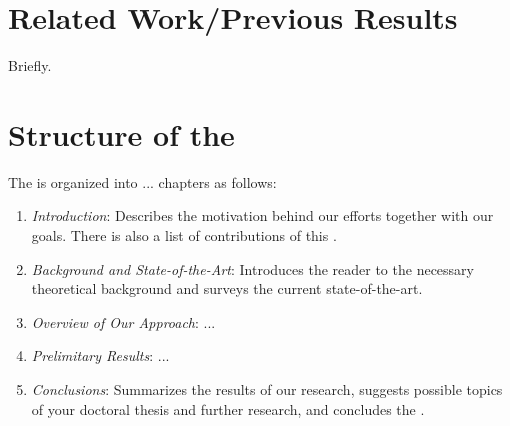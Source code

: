 \section{Related Work/Previous Results}
Briefly.

\section{Structure of the \Thesis{}}
The \thesis{} is organized into ... chapters as follows:
\begin{enumerate}
\item \emph{Introduction}: Describes the motivation behind our efforts together with our goals. There is also a list of contributions of this \thesis. 

\item \emph{Background and State-of-the-Art}: Introduces the reader to the necessary theoretical background and surveys the current state-of-the-art.

\item \emph{Overview of Our Approach}: ...

\item \emph{Prelimitary Results}: ...

\item \emph{Conclusions}: Summarizes the results of our research, suggests possible topics of your doctoral thesis and further research, and concludes the \thesis.
\end{enumerate}
